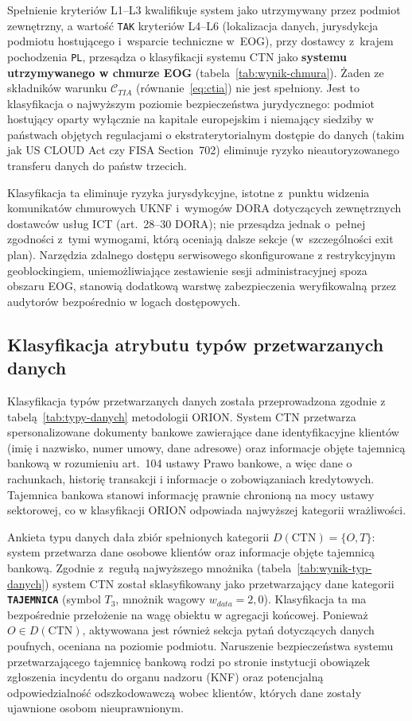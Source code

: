 Spełnienie kryteriów L1--L3 kwalifikuje system jako utrzymywany przez podmiot zewnętrzny, a wartość \texttt{TAK} kryteriów L4--L6 (lokalizacja danych, jurysdykcja podmiotu hostującego i~wsparcie techniczne w~EOG), przy dostawcy z~krajem pochodzenia \texttt{PL}, przesądza o klasyfikacji systemu CTN jako \textbf{systemu utrzymywanego w chmurze EOG} (tabela~\ref{tab:wynik-chmura}). Żaden ze składników warunku $\mathcal{C}_{TIA}$ (równanie~\eqref{eq:ctia}) nie jest spełniony. Jest to klasyfikacja o najwyższym poziomie bezpieczeństwa jurydycznego: podmiot hostujący oparty wyłącznie na kapitale europejskim i niemający siedziby w państwach objętych regulacjami o ekstraterytorialnym dostępie do danych (takim jak US CLOUD Act czy FISA Section~702) eliminuje ryzyko nieautoryzowanego transferu danych do państw trzecich.

Klasyfikacja ta eliminuje ryzyka jurysdykcyjne, istotne z~punktu widzenia komunikatów chmurowych UKNF i~wymogów DORA dotyczących zewnętrznych dostawców usług ICT (art.~28--30 DORA); nie przesądza jednak o~pełnej zgodności z~tymi wymogami, którą oceniają dalsze sekcje (w~szczególności exit plan). Narzędzia zdalnego dostępu serwisowego skonfigurowane z restrykcyjnym geoblockingiem, uniemożliwiające zestawienie sesji administracyjnej spoza obszaru EOG, stanowią dodatkową warstwę zabezpieczenia weryfikowalną przez audytorów bezpośrednio w logach dostępowych.

\subsection{Klasyfikacja atrybutu typów przetwarzanych danych}

Klasyfikacja typów przetwarzanych danych została przeprowadzona zgodnie z tabelą~\ref{tab:typy-danych} metodologii ORION. System CTN przetwarza spersonalizowane dokumenty bankowe zawierające dane identyfikacyjne klientów (imię i nazwisko, numer umowy, dane adresowe) oraz informacje objęte tajemnicą bankową w rozumieniu art.~104 ustawy Prawo bankowe, a więc dane o rachunkach, historię transakcji i informacje o zobowiązaniach kredytowych. Tajemnica bankowa stanowi informację prawnie chronioną na mocy ustawy sektorowej, co w klasyfikacji ORION odpowiada najwyższej kategorii wrażliwości.

Ankieta typu danych dała zbiór spełnionych kategorii $D(\text{CTN}) = \{O, T\}$: system przetwarza dane osobowe klientów oraz informacje objęte tajemnicą bankową. Zgodnie z~regułą najwyższego mnożnika (tabela~\ref{tab:wynik-typ-danych}) system CTN został sklasyfikowany jako przetwarzający dane kategorii \textbf{\texttt{TAJEMNICA}} (symbol $T_3$, mnożnik wagowy $w_{data} = 2{,}0$). Klasyfikacja ta ma bezpośrednie przełożenie na wagę obiektu w agregacji końcowej. Ponieważ $O \in D(\text{CTN})$, aktywowana jest również sekcja pytań dotyczących danych poufnych, oceniana na poziomie podmiotu. Naruszenie bezpieczeństwa systemu przetwarzającego tajemnicę bankową rodzi po stronie instytucji obowiązek zgłoszenia incydentu do organu nadzoru (KNF) oraz potencjalną odpowiedzialność odszkodowawczą wobec klientów, których dane zostały ujawnione osobom nieuprawnionym.

